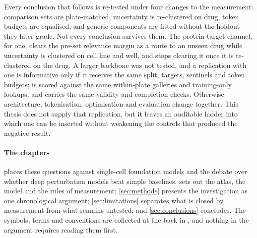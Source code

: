 Every conclusion that follows is re-tested under four changes to the
measurement: comparison sets are plate-matched, uncertainty is re-clustered on
drug, token budgets are equalised, and generic components are fitted without the
holdout they later grade. Not every conclusion survives them. The protein-target channel, for one, clears the pre-set relevance margin as a route to an unseen drug while uncertainty is clustered on cell line and well, and stops clearing it once it is re-clustered on the drug. A larger backbone was not tested, and a replication
with one is informative only if it receives the same split, targets, sentinels
and token budgets; is scored against the same
within-plate galleries and training-only lookups; and carries the same validity
and completion checks. Otherwise architecture, tokenisation, optimisation and
evaluation change together. This thesis does not supply that replication, but it
leaves an auditable ladder into which one can be inserted without weakening the
controls that produced the negative result.

\paragraph{The chapters}  places these questions against
single-cell foundation models and the debate over whether deep perturbation
models beat simple baselines.  sets out the atlas, the
model and the rules of measurement; \cref{sec:methods} presents the investigation
as one chronological argument; \cref{sec:limitations} separates what is closed by
measurement from what remains untested; and \cref{sec:conclusions} concludes. The
symbols, terms and conventions are collected at the back in ,
and nothing in the argument requires reading them first.
